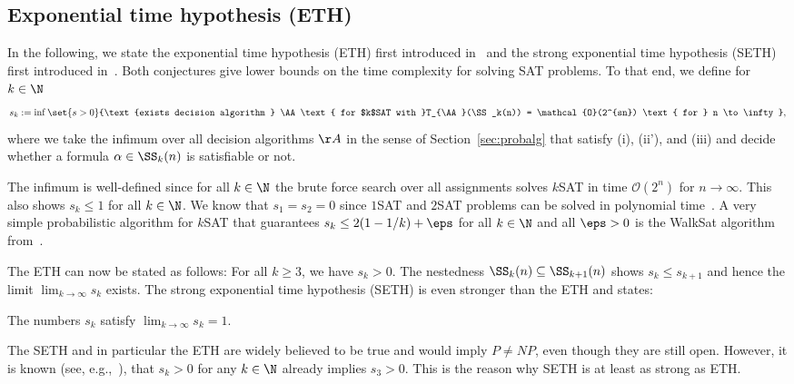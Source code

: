 \documentclass{amsart}[11pt]
\numberwithin{equation}{section}
\newcommand{\order}{\mathcal{O}}
\newcommand{\worstTime}{T}
\numberwithin{theorem}{section}
\begin{document}
\subsection{Exponential time hypothesis (ETH)}\label{sec:seth}
In the following, we state the exponential time hypothesis (ETH) first introduced in~\cite{eth} and the strong exponential time hypothesis (SETH) first introduced in~\cite{seth}. Both conjectures give lower bounds on the time complexity for solving SAT problems.
To that end, we define for $k\in\N$ 
\begin{align}\label{eq:s_k_definition}
    s_k := \inf\set{s > 0 }{\text{exists decision algorithm } \AA\text{ for $k$SAT with }\worstTime_{\AA}(\SS_k(n)) = \order(2^{sn}) \text{ for } n \to \infty},
\end{align}
where we take the infimum over all decision algorithms $\AA$ in the sense of Section~\ref{sec:probalg} that satisfy (i), (ii'), and (iii) and decide whether a formula $\alpha\in\SS_k(n)$ is satisfiable or not. 

The infimum is well-defined since for all $k \in \N$ the brute force search over all assignments solves $k$SAT in time $\order(2^{n})$ for $n \to \infty$. This also shows $s_k \leq 1$ for all $k \in \N$. We know that $s_1 = s_2 = 0$ since $1$SAT and $2$SAT problems can be solved in polynomial time~\cite{2sat}. A very simple probabilistic algorithm for $k$SAT that guarantees $s_k\leq 2(1-1/k)+\eps$ for all $k\in\N$ and all $\eps>0$ is the WalkSat algorithm from~\cite{walkSat}.

The ETH can now be stated as follows: For all $k \geq 3$, we have $s_k > 0$.
The nestedness $\SS_k(n)\subseteq \SS_{k+1}(n)$ shows $s_k\leq s_{k+1}$ and hence the limit $\lim_{k \to \infty} s_k$ exists.
The strong exponential time hypothesis (SETH) is even stronger than the ETH and states:
\begin{assumption}[SETH]\label{ass:SETH}
   The numbers $s_k$ satisfy $\lim_{k \to \infty} s_k = 1$.
\end{assumption}
The SETH and in particular the ETH are widely believed to be true and would imply $P\neq NP$, even though they are still open. However, it is known (see, e.g.,~\cite{IMPAGLIAZZO2001512}), that $s_k>0$ for any $k\in\N$ already implies $s_3>0$. This is the reason why SETH is at least as strong as ETH.
\end{document}
